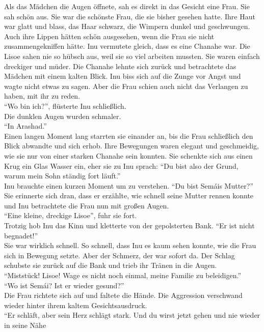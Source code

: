 Als das Mädchen die Augen öffnete, sah es direkt in das Gesicht eine Frau. Sie sah schön aus. 
Sie war die schönste Frau, die sie bisher gesehen hatte. Ihre Haut war glatt und blass, das Haar 
schwarz, die Wimpern dunkel und geschwungen. Auch ihre Lippen hätten schön ausgesehen, wenn die 
Frau sie nicht zusammengekniffen hätte. Inu vermutete gleich, dass es eine Chanahe war. Die Lisoe 
sahen nie so hübsch aus, weil sie so viel arbeiten mussten. Sie waren einfach dreckiger und müder. 
Die Chanahe lehnte sich zurück und betrachtete das Mädchen mit einem kalten Blick. Inu biss sich 
auf die Zunge vor Angst und wagte nicht etwas zu sagen. Aber die Frau schien auch nicht das 
Verlangen zu haben, mit ihr zu reden. \\
``Wo bin ich?'', flüsterte Inu schließlich.\\
Die dunklen Augen wurden schmaler.\\
``In Arashad.''\\
Einen langen Moment lang starrten sie einander an, bis die Frau schließlich den Blick abwandte und 
sich erhob. Ihre Bewegungen waren elegant und geschmeidig, wie sie nur von einer starken Chanahe 
sein konnten. Sie schenkte sich aus einen Krug ein Glas Wasser ein, eher sie zu Inu sprach: ``Du 
bist also der Grund, warum mein Sohn ständig fort läuft.''\\
Inu brauchte einen kurzen Moment um zu verstehen. ``Du bist Semáis Mutter?''\\
Sie erinnerte sich dran, dass er erzählte, wie schnell seine Mutter rennen konnte und Inu 
betrachtete die Frau nun mit großen Augen. \\
``Eine kleine, dreckige Lisoe'', fuhr sie fort.\\
Trotzig hob Inu das Kinn und kletterte von der gepolsterten Bank. ``Er ist nicht begnadet!''\\
Sie war wirklich schnell. So schnell, dass Inu es kaum sehen konnte, wie die Frau sich in Bewegung 
setzte. Aber der Schmerz, der war sofort da. Der Schlag schubste sie zurück auf die Bank und 
trieb ihr Tränen in die Augen. \\
``Miststück! Lisoe! Wage es nicht noch einmal, meine Familie zu beleidigen.''\\
``Wo ist Semái? Ist er wieder gesund?''\\
Die Frau richtete sich auf und faltete die Hände. Die Aggression verschwand wieder hinter ihrem 
kaltem Gesichtsausdruck. \\
``Er schläft, aber sein Herz schlägt stark. Und du wirst jetzt gehen und nie wieder in seine Nähe 
